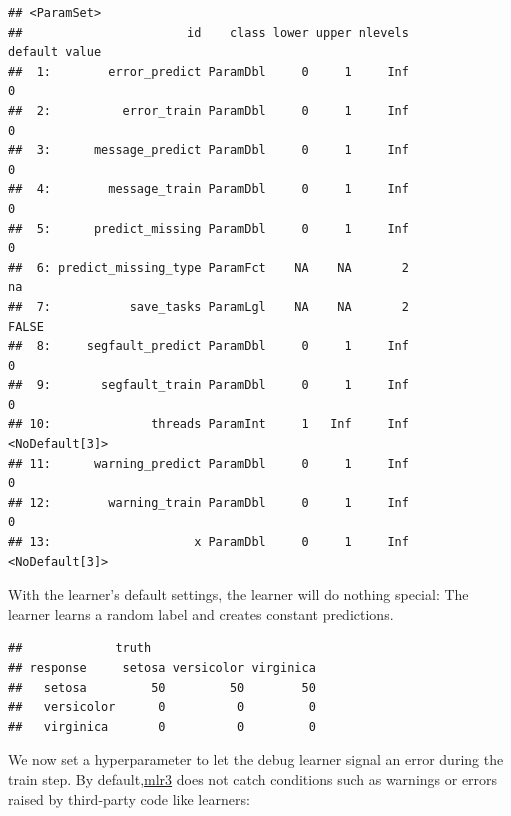 \documentclass[
]{scrbook}
\newenvironment{Shaded}{\begin{snugshade}}{\end{snugshade}}
\newcommand{\FunctionTok}[1]{\textcolor[rgb]{0.00,0.00,0.00}{#1}}
\newcommand{\NormalTok}[1]{#1}
\newcommand{\OtherTok}[1]{\textcolor[rgb]{0.56,0.35,0.01}{#1}}
\newcommand{\SpecialCharTok}[1]{\textcolor[rgb]{0.00,0.00,0.00}{#1}}
\newcommand{\StringTok}[1]{\textcolor[rgb]{0.31,0.60,0.02}{#1}}
\renewenvironment{Shaded} {\begin{snugshade}\small} {\end{snugshade}}
\begin{document}
\begin{verbatim}
## <ParamSet>
##                       id    class lower upper nlevels        default value
##  1:        error_predict ParamDbl     0     1     Inf              0      
##  2:          error_train ParamDbl     0     1     Inf              0      
##  3:      message_predict ParamDbl     0     1     Inf              0      
##  4:        message_train ParamDbl     0     1     Inf              0      
##  5:      predict_missing ParamDbl     0     1     Inf              0      
##  6: predict_missing_type ParamFct    NA    NA       2             na      
##  7:           save_tasks ParamLgl    NA    NA       2          FALSE      
##  8:     segfault_predict ParamDbl     0     1     Inf              0      
##  9:       segfault_train ParamDbl     0     1     Inf              0      
## 10:              threads ParamInt     1   Inf     Inf <NoDefault[3]>      
## 11:      warning_predict ParamDbl     0     1     Inf              0      
## 12:        warning_train ParamDbl     0     1     Inf              0      
## 13:                    x ParamDbl     0     1     Inf <NoDefault[3]>
\end{verbatim}

With the learner's default settings, the learner will do nothing special: The learner learns a random label and creates constant predictions.

\begin{Shaded}
\end{Shaded}

\begin{verbatim}
##             truth
## response     setosa versicolor virginica
##   setosa         50         50        50
##   versicolor      0          0         0
##   virginica       0          0         0
\end{verbatim}

We now set a hyperparameter to let the debug learner signal an error during the train step.
By default,\href{https://github.com/mlr-org/mlr3}{mlr3} does not catch conditions such as warnings or errors raised by third-party code like learners:
\end{document}
